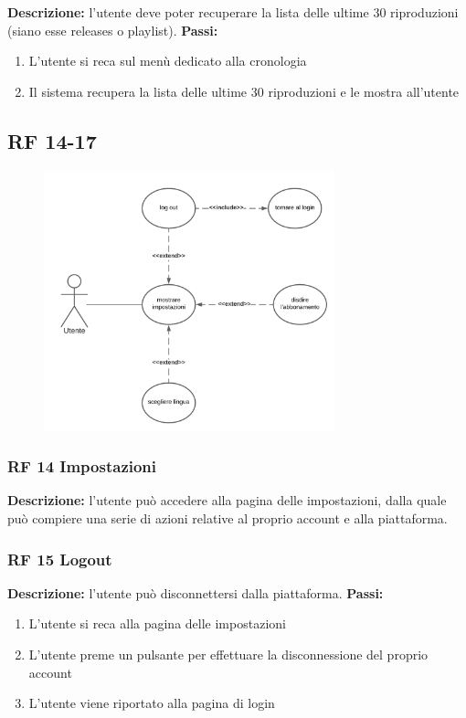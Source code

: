 \documentclass[a4paper,12pt]{article}
\begin{document}
\textbf{Descrizione:} l’utente deve poter recuperare la lista delle ultime 30 riproduzioni (siano esse releases o playlist). \newline
\textbf{Passi:}
\begin{enumerate}
    \item L’utente si reca sul menù dedicato alla cronologia
    \item Il sistema recupera la lista delle ultime 30 riproduzioni e le mostra all’utente
\end{enumerate}

\subsection*{RF 14-17}

\begin{figure}[htp]
    \centering
    \includegraphics[width=0.75\textwidth]{diagrams/use-case-14-15-16-17.png}
\end{figure}

\subsubsection*{RF 14 Impostazioni}

\textbf{Descrizione:} l’utente può accedere alla pagina delle impostazioni, dalla quale può compiere una serie di azioni relative al proprio account e alla piattaforma.

\subsubsection*{RF 15 Logout}

\textbf{Descrizione:} l’utente può disconnettersi dalla piattaforma. \newline
\textbf{Passi:}
\begin{enumerate}
    \item L’utente si reca alla pagina delle impostazioni
    \item L’utente preme un pulsante per effettuare la disconnessione del proprio account
    \item L’utente viene riportato alla pagina di login
\end{enumerate}
\end{document}
